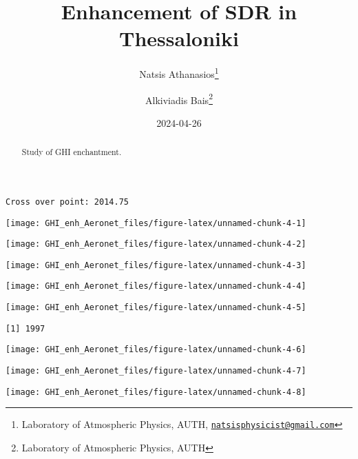\documentclass[
  10pt,
  a4paper,oneside]{article}
\title{Enhancement of SDR in Thessaloniki}
\author{Natsis Athanasios\footnote{Laboratory of Atmospheric Physics, AUTH, \href{mailto:natsisphysicist@gmail.com}{\nolinkurl{natsisphysicist@gmail.com}}} \and Alkiviadis Bais\footnote{Laboratory of Atmospheric Physics, AUTH}}
\date{2024-04-26}
\begin{document}
\maketitle
\begin{abstract}
Study of GHI enchantment.
\end{abstract}

{
\hypersetup{linkcolor=}
\setcounter{tocdepth}{4}
\tableofcontents
}
\begin{verbatim}
Cross over point: 2014.75 
\end{verbatim}

\begin{center}\texttt{[image: GHI\_enh\_Aeronet\_files/figure-latex/unnamed-chunk-4-1]} \end{center}

\begin{center}\texttt{[image: GHI\_enh\_Aeronet\_files/figure-latex/unnamed-chunk-4-2]} \end{center}

\begin{center}\texttt{[image: GHI\_enh\_Aeronet\_files/figure-latex/unnamed-chunk-4-3]} \end{center}

\begin{center}\texttt{[image: GHI\_enh\_Aeronet\_files/figure-latex/unnamed-chunk-4-4]} \end{center}

\begin{center}\texttt{[image: GHI\_enh\_Aeronet\_files/figure-latex/unnamed-chunk-4-5]} \end{center}

\begin{verbatim}
[1] 1997
\end{verbatim}

\begin{center}\texttt{[image: GHI\_enh\_Aeronet\_files/figure-latex/unnamed-chunk-4-6]} \end{center}

\begin{center}\texttt{[image: GHI\_enh\_Aeronet\_files/figure-latex/unnamed-chunk-4-7]} \end{center}

\begin{center}\texttt{[image: GHI\_enh\_Aeronet\_files/figure-latex/unnamed-chunk-4-8]} \end{center}
\end{document}
